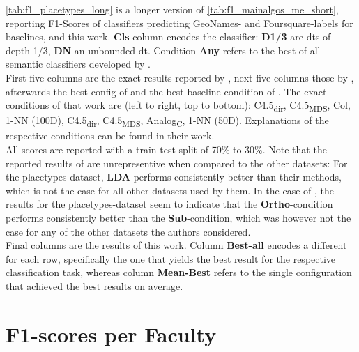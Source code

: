 \autoref{tab:f1_placetypes_long} is a longer version of \autoref{tab:f1_mainalgos_me_short}, reporting F1-Scores of classifiers predicting GeoNames- and Foursquare-labels for baselines, \mainalgos and this work. 
\textbf{Cls} column encodes the classifier: \textbf{D1/3} are \glspl{dt} of depth 1/3, \textbf{DN} an unbounded \gls{dt}. Condition \textbf{Any} refers to the best of all semantic classifiers developed by \cite{Derrac2015}. \\
First five columns are the exact results reported by \cite{Alshaikh2020}, next five columns those by \cite{Ager2018}, afterwards the best config of \cite{Derrac2015} and the best baseline-condition of \cite{Derrac2015}. The exact conditions of that work are (left to right, top to bottom): C4.5\textsubscript{dir}, C4.5\textsubscript{MDS}, Col, 1-NN (100D), C4.5\textsubscript{dir}, C4.5\textsubscript{MDS}, Analog\textsubscript{C}, 1-NN (50D). Explanations of the respective conditions can be found in their work. \\
All scores are reported with a train-test split of 70\% to 30\%. Note that the reported results of \cite{Ager2018} are unrepresentive when compared to the other datasets: For the placetypes-dataset, \textbf{LDA} performs consistently better than their methods, which is not the case for all other datasets used by them. In the case of \cite{Alshaikh2020}, the results for the placetypes-dataset seem to indicate that the \textbf{Ortho}-condition performs consistently better than the \textbf{Sub}-condition, which was however not the case for any of the other datasets the authors considered. \\
Final columns are the results of this work. Column \textbf{Best-all} encodes a different for each row, specifically the one that yields the best result for the respective classification task, whereas column \textbf{Mean-Best} refers to the single configuration that achieved the best results on average. 



\section{F1-scores per Faculty}


